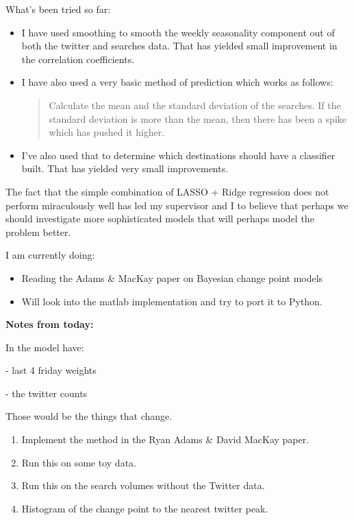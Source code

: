 \documentclass[11pt]{amsart}
\begin{document}
What's been tried so far:

\begin{itemize}
\item I have used smoothing to smooth the weekly seasonality component out of both the twitter and searches data.
That has yielded small improvement in the correlation coefficients.
\item I have also used a very basic method of prediction which works as follows:
\begin{quotation}
Calculate the mean and the standard deviation of the searches.
If the standard deviation is more than the mean, then there has been a spike which has pushed it higher.
\end{quotation}
\item I've also used that to determine which destinations should have a classifier built. That has yielded very small improvements.
\end{itemize}


The fact that the simple combination of LASSO + Ridge regression does not perform miraculously well has led my supervisor and I to believe that perhaps we should investigate more sophisticated models that will perhaps model the problem better.

I am currently doing:

\begin{itemize}
\item Reading the Adams \& MacKay paper on Bayesian change point models
\item Will look into the matlab implementation and try to port it to Python.
\end{itemize}


\textbf{Notes from today:}

In the model have:

- last 4 friday weights

- the twitter counts

Those would be the things that change.

\begin{enumerate}
\item Implement the method in the Ryan Adams \& David MacKay paper.
\item Run this on some toy data.
\item Run this on the search volumes without the Twitter data.
\item Histogram of the change point to the nearest twitter peak.
\end{enumerate}
\end{document}

